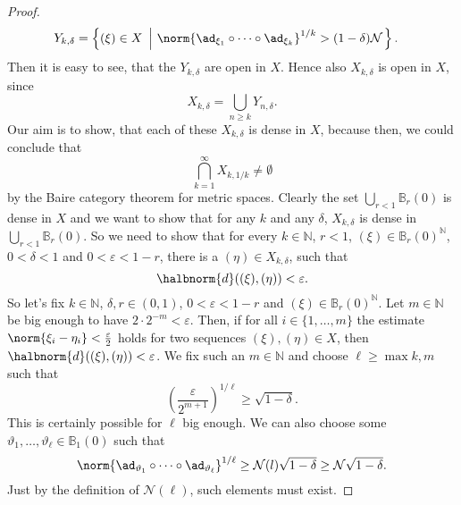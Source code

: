 \documentclass[
11pt,                          %
english                        %
]{article}
\begin{document}
\begin{proof}
\begin{align*}
		Y_{k, \delta}
		&=
		\left\{
			(\xi) \in X
		\ \left| \
			\norm{ \ad_{\xi_1} \circ \cdots \circ \ad_{\xi_k} }^{1/k}
			>
			(1 - \delta) \mathcal{N}
		\right.
		\right\}.
	\end{align*}
	Then it is easy to see, that the $Y_{k, \delta}$ are open in $X$. Hence also 
	$X_{k, \delta}$ is open in $X$, since
	\begin{equation*}
		X_{k, \delta}
		=
		\bigcup\limits_{n \geq k}
		Y_{n, \delta}.
	\end{equation*}
	Our aim is to show, that each of these $X_{k, \delta}$ is dense in $X$, because 
	then, we could conclude that
	\begin{equation*}
		\bigcap\limits_{k = 1}^\infty
		X_{k, 1/k}
		\neq
		\emptyset
	\end{equation*}
	by the Baire category theorem for metric spaces. Clearly the set
	$\bigcup\limits_{r < 1} \mathbb{B}_r(0)$
	is dense in $X$ and we want to show that for any $k$ and any $\delta$, 
	$X_{k, \delta}$ is dense in $\bigcup\limits_{r < 1} \mathbb{B}_r(0)$. 
	So we need to show that for every $k \in \mathbb{N}$, $r < 1$, 
	$(\xi) \in \mathbb{B}_r(0)^{\mathbb{N}}$, $0 < \delta < 1$ and $0 < \varepsilon 
	< 1 - r$, there is a $(\eta) \in X_{k, \delta}$, such that
	\begin{equation*}
		\halbnorm{d}((\xi), (\eta))
		<
		\varepsilon.
	\end{equation*}
	So let's fix $k \in \mathbb{N}$, $\delta, r \in (0,1)$, $0 < \varepsilon < 1-r$
	and $(\xi) \in \mathbb{B}_r(0)^\mathbb{N}$. Let $m \in \mathbb{N}$ be big enough
	to have $2 \cdot 2^{-m} < \varepsilon$. Then, if for all $i \in \{1, \ldots, 
	m\}$ the estimate $\norm{\xi_i - \eta_i} < \frac{\varepsilon}{2}$ holds for two 
	sequences $(\xi), (\eta) \in X$, then $\halbnorm{d}((\xi), (\eta)) < 
	\varepsilon$. We fix such an $m \in \mathbb{N}$ and choose $\ell \geq 
	\max{k, m}$ such that
	\begin{equation*}
		\left(
			\frac{\varepsilon}{2^{m + 1}}
		\right)^{1 / \ell}
		\geq
		\sqrt{1 - \delta}.
	\end{equation*}
	This is certainly possible for $\ell$ big enough. We can also choose some
	$\vartheta_1, \ldots, \vartheta_\ell \in \mathbb{B}_1(0)$ such that
	\begin{equation*}
		\norm{
			\ad_{\vartheta_1} \circ \cdots \circ \ad_{\vartheta_\ell}
		}^{1/ \ell}
		\geq
		\mathcal{N}(l) \sqrt{1 - \delta}
		\geq
		\mathcal{N} \sqrt{1 - \delta}.
	\end{equation*}
	Just by the definition of $\mathcal{N}(\ell)$, such elements must exist.

\end{proof}
\end{document}
